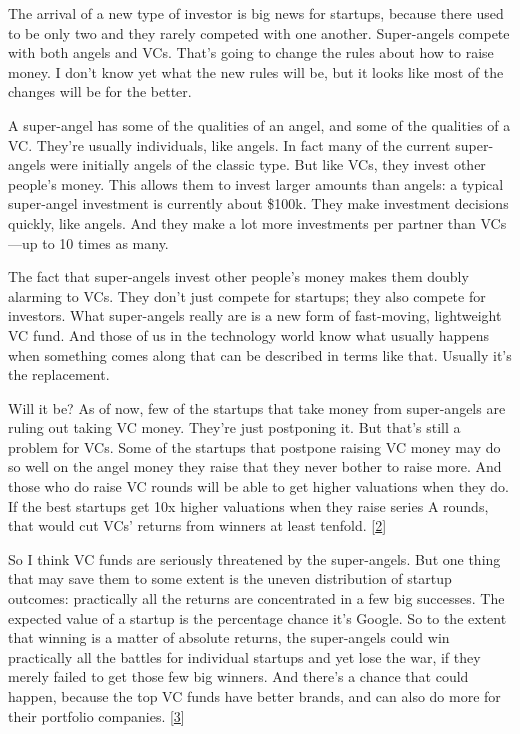 The arrival of a new type of investor is big news for startups, because
there used to be only two and they rarely competed with one another.
Super-angels compete with both angels and VCs. That's going to change
the rules about how to raise money. I don't know yet what the new rules
will be, but it looks like most of the changes will be for the better.

A super-angel has some of the qualities of an angel, and some of the
qualities of a VC. They're usually individuals, like angels. In fact
many of the current super-angels were initially angels of the classic
type. But like VCs, they invest other people's money. This allows them
to invest larger amounts than angels: a typical super-angel investment
is currently about \$100k. They make investment decisions quickly, like
angels. And they make a lot more investments per partner than VCs---up
to 10 times as many.

The fact that super-angels invest other people's money makes them doubly
alarming to VCs. They don't just compete for startups; they also compete
for investors. What super-angels really are is a new form of
fast-moving, lightweight VC fund. And those of us in the technology
world know what usually happens when something comes along that can be
described in terms like that. Usually it's the replacement.

Will it be? As of now, few of the startups that take money from
super-angels are ruling out taking VC money. They're just postponing it.
But that's still a problem for VCs. Some of the startups that postpone
raising VC money may do so well on the angel money they raise that they
never bother to raise more. And those who do raise VC rounds will be
able to get higher valuations when they do. If the best startups get 10x
higher valuations when they raise series A rounds, that would cut VCs'
returns from winners at least tenfold. {[}\hyperref[f2n]{2}{]}

So I think VC funds are seriously threatened by the super-angels. But
one thing that may save them to some extent is the uneven distribution
of startup outcomes: practically all the returns are concentrated in a
few big successes. The expected value of a startup is the percentage
chance it's Google. So to the extent that winning is a matter of
absolute returns, the super-angels could win practically all the battles
for individual startups and yet lose the war, if they merely failed to
get those few big winners. And there's a chance that could happen,
because the top VC funds have better brands, and can also do more for
their portfolio companies. {[}\hyperref[f3n]{3}{]}

